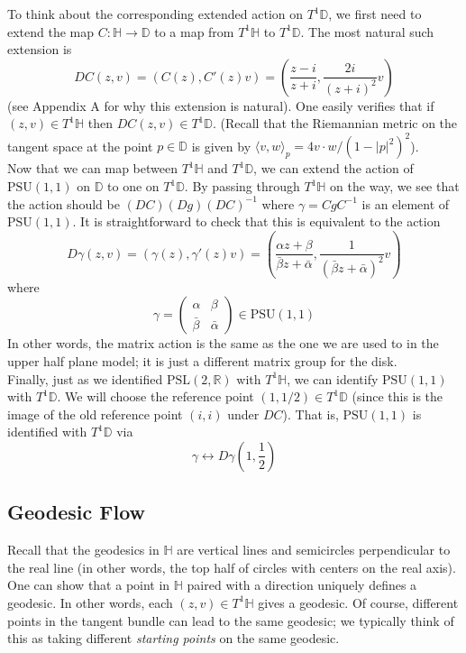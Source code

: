 \documentclass[]{article}
\begin{document}
To think about the corresponding extended action on $T^1\mathbb{D}$, we first need to extend the map $C: \mathbb{H} \rightarrow \mathbb{D}$ to a map from $T^1\mathbb{H}$ to $T^1\mathbb{D}$.
The most natural such extension is
$$
DC(z, v) = (C(z), C'(z)v) = \left( \frac{z - i}{z + i}, \frac{2i}{(z + i)^2}v \right)
$$
(see Appendix A for why this extension is natural).
One easily verifies that if $(z, v) \in T^1\mathbb{H}$ then $DC(z, v) \in T^1\mathbb{D}$.
(Recall that the Riemannian metric on the tangent space at the point $p \in \mathbb{D}$ is given by $\langle v, w \rangle_p = 4v\cdot w/(1 - |p|^2)^2$).
\\

Now that we can map between $T^1\mathbb{H}$ and $T^1\mathbb{D}$, we can extend the action of $\text{PSU}(1, 1)$ on $\mathbb{D}$ to one on $T^1\mathbb{D}$.
By passing through $T^1\mathbb{H}$ on the way, we see that the action should be $(DC)(Dg)(DC)^{-1}$ where $\gamma = CgC^{-1}$ is an element of $\text{PSU}(1, 1)$.
It is straightforward to check that this is equivalent to the action
$$
D\gamma(z, v) = (\gamma(z), \gamma'(z)v) = \left( \frac{\alpha z + \beta}{\bar{\beta}z + \bar{\alpha}}, \frac{1}{(\bar{\beta}z + \bar{\alpha})^2}v \right)
$$
where
$$
\gamma =
\begin{pmatrix}
\alpha & \beta \\
\bar{\beta} & \bar{\alpha}
\end{pmatrix} \in \text{PSU}(1, 1)
$$
In other words, the matrix action is the same as the one we are used to in the upper half plane model; it is just a different matrix group for the disk.
\\

Finally, just as we identified $\text{PSL}(2, \mathbb{R})$ with $T^1\mathbb{H}$, we can identify $\text{PSU}(1, 1)$ with $T^1\mathbb{D}$.
We will choose the reference point $(1, 1/2) \in T^1\mathbb{D}$ (since this is the image of the old reference point $(i, i)$ under $DC$).
That is, $\text{PSU}(1, 1)$ is identified with $T^1\mathbb{D}$ via
$$
\gamma \longleftrightarrow D\gamma\left( 1, \frac{1}{2} \right)
$$

\subsection*{Geodesic Flow}

Recall that the geodesics in $\mathbb{H}$ are vertical lines and semicircles perpendicular to the real line (in other words, the top half of circles with centers on the real axis).
One can show that a point in $\mathbb{H}$ paired with a direction uniquely defines a geodesic.
In other words, each $(z, v) \in T^1\mathbb{H}$ gives a geodesic.
Of course, different points in the tangent bundle can lead to the same geodesic; we typically think of this as taking different \textit{starting points} on the same geodesic.
\\
\end{document}
